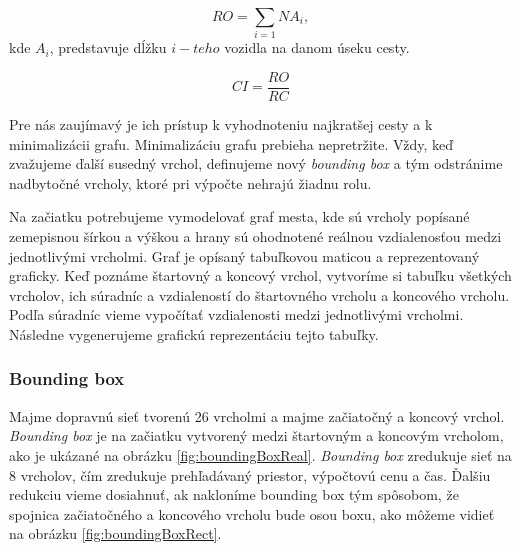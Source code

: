 $$RO = \sum_{i=1}{N} A_i,$$ kde $A_i$, predstavuje dĺžku $i-teho$ vozidla na danom úseku cesty.

$$CI = \frac{RO}{RC}$$

Pre nás zaujímavý je ich prístup k vyhodnoteniu najkratšej cesty a k minimalizácii grafu. Minimalizáciu grafu prebieha nepretržite. Vždy, keď zvažujeme ďalší susedný vrchol, definujeme nový \textit{bounding box} a tým odstránime nadbytočné vrcholy, ktoré pri výpočte nehrajú žiadnu rolu.

Na začiatku potrebujeme vymodelovať graf mesta, kde sú vrcholy popísané zemepisnou šírkou a výškou a hrany sú ohodnotené reálnou vzdialenosťou medzi jednotlivými vrcholmi. Graf je opísaný tabuľkovou maticou a reprezentovaný graficky. Keď poznáme štartovný a koncový vrchol, vytvoríme si tabuľku všetkých vrcholov, ich súradníc a vzdialeností do štartovného vrcholu a koncového vrcholu. Podľa súradníc vieme vypočítať vzdialenosti medzi jednotlivými vrcholmi. Následne vygenerujeme grafickú reprezentáciu tejto tabuľky. 

\subsubsection{Bounding box}
Majme dopravnú sieť tvorenú 26 vrcholmi a majme začiatočný a koncový vrchol. \textit{Bounding box} je na začiatku vytvorený medzi štartovným a koncovým vrcholom, ako je ukázané na obrázku \ref{fig:boundingBoxReal}. \textit{Bounding box} zredukuje sieť na 8 vrcholov, čím zredukuje prehľadávaný priestor, výpočtovú cenu a čas. Ďalšiu redukciu vieme dosiahnuť, ak nakloníme bounding box tým spôsobom, že spojnica začiatočného a koncového vrcholu bude osou boxu, ako môžeme vidieť na obrázku \ref{fig:boundingBoxRect}. 

